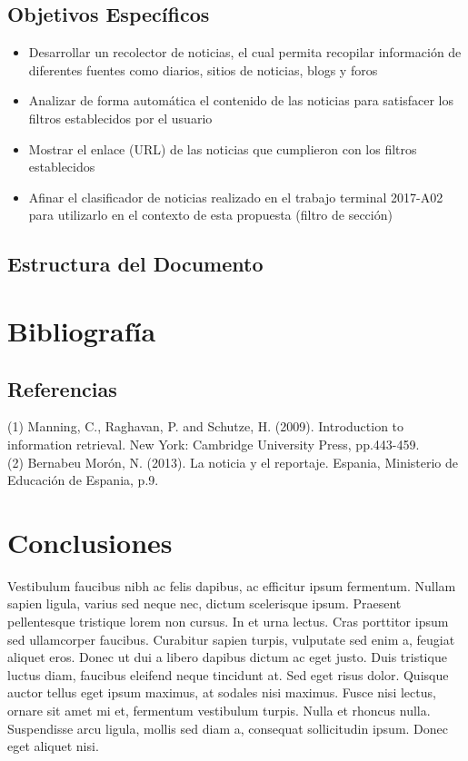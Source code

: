 \documentclass{book}
\begin{document}
\section{Objetivos Específicos}
\begin{itemize}
  \item Desarrollar un recolector de noticias, el cual permita recopilar información de diferentes fuentes como diarios, sitios de noticias, blogs y foros
  \item Analizar de forma automática el contenido de las noticias para satisfacer los filtros establecidos por el usuario
  \item Mostrar el enlace (URL) de las noticias que cumplieron con los filtros establecidos
  \item Afinar el clasificador de noticias realizado en el trabajo terminal 2017-A02 para utilizarlo en el contexto de esta propuesta (filtro de sección) 

\end{itemize}
\section{Estructura del Documento}




\chapter{Bibliografía}\label{chp:introduccion}
\section{Referencias}
(1) Manning, C., Raghavan, P. and Schutze, H. (2009). Introduction to information retrieval. New York: Cambridge University Press, pp.443-459.\\

(2) Bernabeu Morón, N. (2013). La noticia y el reportaje. Espania, Ministerio de Educación de Espania, p.9.



\chapter{Conclusiones}


Vestibulum faucibus nibh ac felis dapibus, ac efficitur ipsum fermentum. Nullam sapien ligula, varius sed neque nec, dictum scelerisque ipsum. Praesent pellentesque tristique lorem non cursus. In et urna lectus. Cras porttitor ipsum sed ullamcorper faucibus. Curabitur sapien turpis, vulputate sed enim a, feugiat aliquet eros. Donec ut dui a libero dapibus dictum ac eget justo. Duis tristique luctus diam, faucibus eleifend neque tincidunt at. Sed eget risus dolor. Quisque auctor tellus eget ipsum maximus, at sodales nisi maximus. Fusce nisi lectus, ornare sit amet mi et, fermentum vestibulum turpis. Nulla et rhoncus nulla. Suspendisse arcu ligula, mollis sed diam a, consequat sollicitudin ipsum. Donec eget aliquet nisi.
\end{document}
